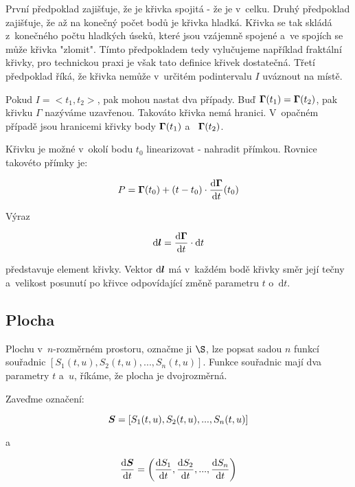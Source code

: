 První předpoklad zajišťuje, že je křivka spojitá - že je v~celku. Druhý předpoklad zajišťuje, že až na konečný počet bodů je křivka hladká. Křivka se tak skládá z~konečného počtu hladkých úseků, které jsou vzájemně spojené a~ve spojích se může křivka "zlomit". Tímto předpokladem tedy vylučujeme například fraktální křivky, pro technickou praxi je však tato definice křivek dostatečná. Třetí předpoklad říká, že křivka nemůže v~určitém podintervalu \(I\) uváznout na místě. 

Pokud \(I = <t_1, t_2>\), pak mohou nastat dva případy. Buď \(\boldsymbol{\Gamma}(t_1) = \boldsymbol{\Gamma}(t_2)\), pak křivku \(\Gamma\) nazýváme uzavřenou. Takováto křivka nemá hranici. V~opačném případě jsou hranicemi křivky body \(\boldsymbol{\Gamma}(t_1)\) a~ \(\boldsymbol{\Gamma}(t_2)\).

Křivku je možné v~okolí bodu \(t_0\) linearizovat - nahradit přímkou. Rovnice takovéto přímky je:

\begin{equation}
P = \boldsymbol{\Gamma}(t_0) + (t - t_0) \cdot \frac{\mathrm{d}\boldsymbol{\Gamma}}{\mathrm{d}t}(t_0)
\end{equation}

Výraz 

\begin{equation}
\mathrm{d}\boldsymbol{l} = \frac{\mathrm{d}\boldsymbol{\Gamma}}{\mathrm{d}t} \cdot \mathrm{d}t 
\end{equation}

představuje element křivky. Vektor \(\mathrm{d}\boldsymbol{l}\) má v~každém bodě křivky směr její tečny a~velikost posunutí po křivce odpovídající změně parametru \(t\) o~\(\mathrm{d}t\).

\subsection{Plocha}

Plochu v~\(n\)-rozměrném prostoru, označme ji \(\S\), lze popsat sadou \(n\) funkcí souřadnic \([S_1(t, u), S_2(t, u), ..., S_n(t, u)]\). Funkce souřadnic mají dva parametry \(t\) a~\(u\), říkáme, že plocha je dvojrozměrná.

Zaveďme označení:

\begin{equation}
\boldsymbol{S} = [S_1(t, u), S_2(t, u), ..., S_n(t, u)]
\end{equation}

a

\begin{equation}
\frac{\mathrm{d}\boldsymbol{S}}{\mathrm{d}t} = \left(\frac{\mathrm{d}S_1}{\mathrm{d}t}, \frac{\mathrm{d}S_2}{\mathrm{d}t}, ..., \frac{\mathrm{d}S_n}{\mathrm{d}t} \right)
\end{equation}

